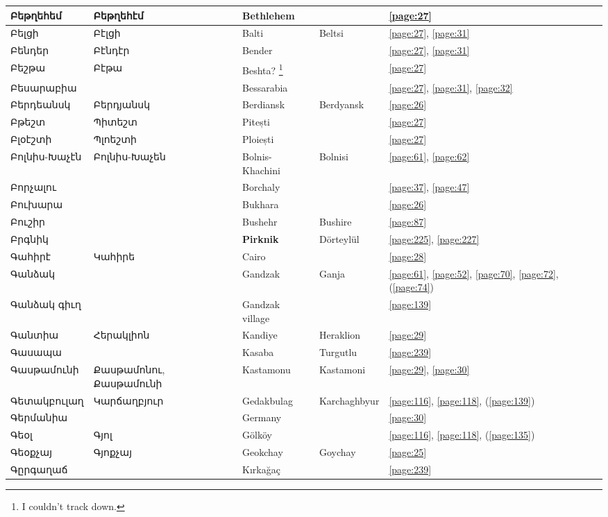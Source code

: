 \begin{center}
\begin{longtable}{|p{}|p{3cm}|p{3cm}|p{2cm}|p{3cm}|}
Բեթղեհեմ&Բեթղեհէմ &
Bethlehem& &\ref{page:27}\\ \hline
Բելցի& Բէլցի&
{Balti}& Beltsi&\ref{page:27}, \ref{page:31}\\ \hline
Բենդեր& Բէնդէր&
{Bender}& &\ref{page:27}, \ref{page:31}\\ \hline
Բեշթա& Բէթա& 
{Beshta?} \footnote{I couldn't track down.}& &\ref{page:27}\\ \hline
Բեսարաբիա&  &Bessarabia & &\ref{page:27}, \ref{page:31}, \ref{page:32}\\ \hline
Բերդեանսկ&Բերդյանսկ &
{Berdiansk}&Berdyansk &\ref{page:26}\\ \hline
Բթեշտ&Պիտեշտ 
&{Pitești}  &    &\ref{page:27}\\ \hline
Բլօէշտի& Պլոեշտի
&{Ploiești}& &\ref{page:27}\\ \hline
Բոլնիս-Խաչէն& Բոլնիս-Խաչեն
& Bolnis-Khachini& Bolnisi&\ref{page:61}, \ref{page:62}\\ \hline
Բորչալու& 
&{Borchaly} & &\ref{page:37}, \ref{page:47}\\ \hline
Բուխարա& &
{Bukhara}& &\ref{page:26}\\ \hline
Բուշիր& & 
{Bushehr}&Bushire &\ref{page:87}\\ \hline
Բրգնիկ& &
\textbf{Pirknik}& Dörteylül& \ref{page:225}, \ref{page:227}\\ \hline
Գահիրէ& Կահիրե
&Cairo & &\ref{page:28}\\ \hline
Գանձակ& & 
Gandzak & Ganja&\ref{page:61}, \ref{page:52}, \ref{page:70}, \ref{page:72}, (\ref{page:74})\\ \hline
Գանձակ գիւղ& &
Gandzak village& &\ref{page:139}\\ \hline
Գանտիա& Հերակլիոն& 
{Kandiye}&Heraklion  & \ref{page:29}\\ \hline
Գասապա& & 
{Kasaba}& Turgutlu&\ref{page:239}\\ \hline
Գասթամունի& Քասթամոնու, Քասթամունի&
  Kastamonu& Kastamoni& \ref{page:29}, \ref{page:30}\\ \hline
Գետակբուլաղ&Կարճաղբյուր 
& {Gedakbulag}&Karchaghbyur &\ref{page:116}, \ref{page:118}, (\ref{page:139})\\ \hline
Գերմանիա& & 
Germany& &\ref{page:30}\\ \hline
Գեօլ&Գյոլ
&{Gölköy} & &\ref{page:116}, \ref{page:118}, (\ref{page:135})\\ \hline
Գեօքչայ&Գյոքչայ
&{Geokchay} &Goychay &\ref{page:25}\\ \hline
Գըրգաղաճ& 
&Kırkağaç & &\ref{page:239}\\ \hline

\end{longtable}
\end{center}
